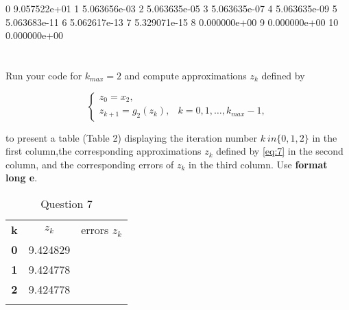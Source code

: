 \documentclass{article}
\begin{document}
0     9.057522e+01
1     5.063656e-03
2     5.063635e-05
3     5.063635e-07
4     5.063635e-09
5     5.063683e-11
6     5.062617e-13
7     5.329071e-15
8     0.000000e+00
9     0.000000e+00
10    0.000000e+00

\section{}
Run your code for $k_{max}=2$ and compute approximations $z_k$ defined by

\begin{equation}\label{eq:7}
    \begin{cases}
    z_0 = x_2,\\
    z_{k+1}=g_2(z_k), & k=0,1,\dots , k_{max}-1,
    \end{cases}
\end{equation}

to present a table (Table 2) displaying the iteration number $k \ in \{0,1,2\}$ in the first column,the corresponding approximations $z_k$ defined by \ref{eq:7} in the second  column, and the corresponding errors of $z_k$ in the third column. Use {\selectfont \textbf{format long e}}.
\vspace{10mm}

\begin{table}[H]
    \centering
    \begin{tabular}{|c|c|c|}
    \Xhline{1pt}
    \textbf{k} &$z_k$    & \makecell{errors \\ $z_k$}  \\
    \Xhline{2 pt}
    \textbf{0}   &9.424829 & \\
    \Xhline{1 pt}
    \textbf{1}   & 9.424778& \\
    \Xhline{1 pt}
    \textbf{2}   & 9.424778 & \\
    \Xhline{1 pt}
    \end{tabular}
    \caption{Question 7}
    \label{tab:q7}
\end{table}
\end{document}
